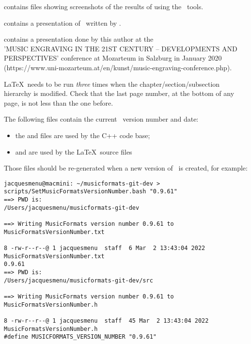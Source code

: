  contains  files showing screenshots of the results of using the \mf\ tools.

 contains a presentation of \libmusicxml\ written by \fober.

 contains a presentation done by this author at the \\
'MUSIC ENGRAVING IN THE 21ST CENTURY -- DEVELOPMENTS AND PERSPECTIVES' conference at Mozarteum in Salzburg in January 2020 (https://www.uni-mozarteum.at/en/kunst/music-engraving-conference.php).


\LaTeX\ needs to be run {\it three} times when the chapter/section/subsection hierarchy is modified. Check that the last page number, at the bottom of any page, is not less than the one before.

The following files contain the current \mf\ version number and date:
\begin{itemize}
\item the  and  files are used by the C++ code base;
\item {} and  are used by the \LaTeX\ source files
\end{itemize}
Those files should be re-generated when a new version of \mf\ is created, for example:
\begin{lstlisting}[language=Terminal]
jacquesmenu@macmini: ~/musicformats-git-dev > scripts/SetMusicFormatsVersionNumber.bash "0.9.61"
==> PWD is:
/Users/jacquesmenu/musicformats-git-dev

==> Writing MusicFormats version number 0.9.61 to MusicFormatsVersionNumber.txt

8 -rw-r--r--@ 1 jacquesmenu  staff  6 Mar  2 13:43:04 2022 MusicFormatsVersionNumber.txt
0.9.61
==> PWD is:
/Users/jacquesmenu/musicformats-git-dev/src

==> Writing MusicFormats version number 0.9.61 to MusicFormatsVersionNumber.h

8 -rw-r--r--@ 1 jacquesmenu  staff  45 Mar  2 13:43:04 2022 MusicFormatsVersionNumber.h
#define MUSICFORMATS_VERSION_NUMBER "0.9.61"
\end{lstlisting}

